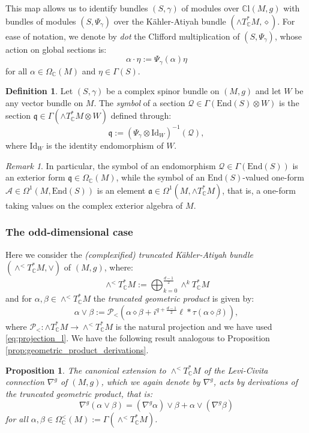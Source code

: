 \documentclass[10pt,a4paper,twoside,reqno]{amsart}
\theoremstyle{plain}
\newtheorem{prop}[thm]{Proposition}
\theoremstyle{definition}
\newtheorem{definition}[thm]{Definition}
\theoremstyle{remark}
\newtheorem{remark}[thm]{Remark}
\newcommand{\End}{\mathrm{End}}
\def\C{\mathbb{C}}
\def\cQ{\mathcal{Q}}
\def\Id{\mathrm{Id}}
\def\fra{\mathfrak{a}}
\def\frq{\mathfrak{q}}
\def\cA{\mathcal{A}}
\def\cP{\mathcal{P}}
\def\cP{\mathcal{P}}
\def\mCl{\mathbb{C}\mathrm{l}}
\begin{document}
This map allows us to identify bundles $(S,\gamma)$ of modules over $\mCl(M,g)$ with bundles of modules $(S,\Psi_\gamma)$ over the Kähler-Atiyah bundle $(\wedge T^*_\C M,\diamond)$. For ease of notation, we denote by \emph{dot} the Clifford multiplication of $(S,\Psi_\gamma)$, whose action on global sections is: $$\alpha\cdot\eta:=\Psi_\gamma(\alpha)\eta$$ for all $\alpha\in\Omega_\C(M)$ and $\eta\in\Gamma(S)$.

\begin{definition}
    Let $(S,\gamma)$ be a complex spinor bundle on $(M,g)$ and let $W$ be any vector bundle on $M$. The \emph{symbol} of a section $\cQ\in\Gamma(\End(S)\otimes W)$ is the section $\frq\in\Gamma(\wedge T^*_\C M\otimes W)$ defined through: $$\frq:=(\Psi_\gamma\otimes\Id_W)^{-1}(\cQ),$$ where $\Id_W$ is the identity endomorphism of $W$.
\end{definition}

\begin{remark}
In particular, the symbol of an endomorphism $\cQ\in\Gamma(\End(S))$ is an exterior form $\frq\in\Omega_\C(M)$, while the symbol of an $\End(S)$-valued one-form $\cA\in\Omega^1(M,\End(S))$ is an element $\fra\in\Omega^1(M,\wedge T^*_\C M)$, that is, a one-form taking values on the complex exterior algebra of $M$.
\end{remark}


\subsubsection{The odd-dimensional case}


Here we consider the \emph{(complexified) truncated Kähler-Atiyah bundle} $(\wedge^<T^*_\C M,\vee)$ of $(M,g)$, where: $$\wedge^<T^*_\C M:=\bigoplus_{k=0}^{\frac{d-1}{2}}\wedge^kT^*_\C M$$ and for $\alpha,\beta\in\wedge^<T^*_\C M$ the \emph{truncated geometric product} is given by: $$\alpha\vee\beta:=\cP_<(\alpha\diamond\beta+i^{q+\frac{d-1}{2}}\ell*\tau(\alpha\diamond\beta)),$$ where $\cP_<\colon\wedge T^*_\C M\to\wedge^<T^*_\C M$ is the natural projection and we have used \eqref{eq:projection_l}. We have the following result analogous to Proposition \ref{prop:geometric_product_derivations}.

\begin{prop}
    The canonical extension to $\wedge^<T^*_\C M$ of the Levi-Civita connection $\nabla^g$ of $(M,g)$, which we again denote by $\nabla^g$, acts by derivations of the truncated geometric product, that is: $$\nabla^g(\alpha\vee\beta)=(\nabla^g\alpha)\vee\beta+\alpha\vee(\nabla^g\beta)$$ for all $\alpha,\beta\in\Omega^<_\C(M):=\Gamma(\wedge^< T^*_\C M)$.
\end{prop}
\end{document}
